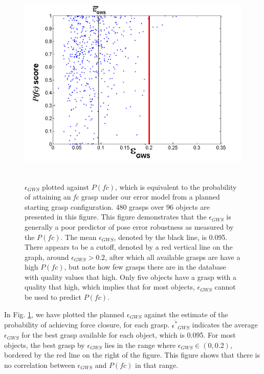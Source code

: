 \begin{figure}
\centering
\includegraphics[height = 100mm]{tooleps_annotated.png}
\caption{$\epsilon_{GWS}$ plotted against $P(fc)$, which is equivalent to the probability of attaining an \emph{fc} grasp under our error model from a planned starting grasp configuration.  480 grasps over 96 objects are presented in this figure. This figure demonstrates that the $\epsilon_{GWS}$ is generally a poor predictor of pose error robustness as measured by the $P(fc)$.  The mean $\epsilon_{GWS}$, denoted by the black line, is 0.095.  There appears to be a cutoff, denoted by a red vertical line on the graph,  around $\epsilon_{GWS} > 0.2$, after which all available grasps are have a high $P(fc)$, but note how few grasps there are in the database with quality values that high. Only five objects have a grasp with a quality that high, which implies that for most objects, $\epsilon_{GWS}$ cannot be used to predict $P(fc)$. }
\label{fig:sp-vs-epsilon}
\end{figure}


 In Fig. \ref{fig:sp-vs-epsilon}, we have plotted the planned $\epsilon_{GWS}$ against the estimate of the probability of achieving force closure, for each grasp.   $\overline{\epsilon^*}_{GWS}$ indicates the average $\epsilon_{GWS}$ for the best grasp available for each object, which is 0.095. For most objects, the best grasp by $\epsilon_{GWS}$ lies in the range where $\epsilon_{GWS}\in(0, 0.2)$, bordered by the red line on the right of the figure.  This figure shows that there is no correlation between $\epsilon_{GWS}$ and $P(fc)$ in that range. 
 
